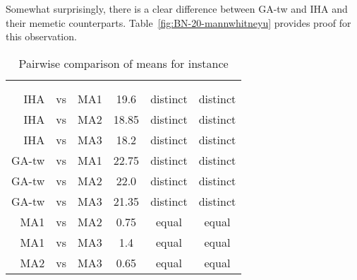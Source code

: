\documentclass[thesis.tex]{subfiles}
\begin{document}
\subsubsection{}
   \renewcommand{\CurrentInstance}{\Instance{BN\textunderscore{}20}}
   \renewcommand{\CurrentInstanceFileEscaped}{BN-20}
   \renewcommand{\CurrentInstanceTexEscaped}{BN\textunderscore{}20}



Somewhat surprisingly, there is a clear difference between \gls{GA-tw} and \gls{IHA} and their memetic counterparts. Table~\vref{fig:BN-20-mannwhitneyu} provides proof for this observation.
\begin{table}[htbp]
   \caption{Pairwise comparison of means for instance \CurrentInstance}
   \label{fig:\CurrentInstanceFileEscaped-mannwhitneyu}
   \centering\small
      \begin{tabular}{r@{\ }c@{\ }l S[table-format=2.2] c c} \toprule
         &&&                          &  \\ \cmidrule(lr){5-6}
         &&&  &  &  \\ \midrule

         \gls{IHA} &vs& \gls{MA1}   & 19.6  & distinct & distinct \\
         \gls{IHA} &vs& \gls{MA2}   & 18.85 & distinct & distinct \\
         \gls{IHA} &vs& \gls{MA3}   & 18.2  & distinct & distinct \\
         \gls{GA-tw} &vs& \gls{MA1} & 22.75 & distinct & distinct \\
         \gls{GA-tw} &vs& \gls{MA2} & 22.0  & distinct & distinct \\
         \gls{GA-tw} &vs& \gls{MA3} & 21.35 & distinct & distinct \\
         \gls{MA1} &vs& \gls{MA2}   &  0.75 &  equal   &  equal   \\
         \gls{MA1} &vs& \gls{MA3}   &  1.4  &  equal   &  equal   \\
         \gls{MA2} &vs& \gls{MA3}   &  0.65 &  equal   &  equal   \\
         \bottomrule
      \end{tabular}
\end{table}
\end{document}
